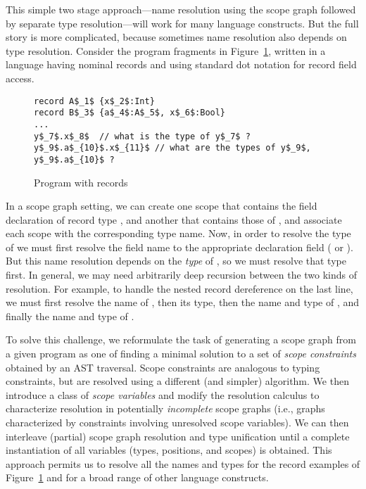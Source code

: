 This simple two stage approach---name resolution using the
scope graph followed by separate type resolution---will work for
many language constructs. But the full story is more complicated,
because sometimes name resolution also depends on type resolution.
Consider the program fragments in Figure~\ref{fig:records-program}, written
in a language having nominal records and using standard dot notation 
for record field access. 
\begin{figure}
\begin{lstlisting}[language=LMR,basicstyle=\lstfigurestyle,breaklines=true]
record A$_1$ {x$_2$:Int}
record B$_3$ {a$_4$:A$_5$, x$_6$:Bool}
...
y$_7$.x$_8$  // what is the type of y$_7$ ? 
y$_9$.a$_{10}$.x$_{11}$ // what are the types of y$_9$, y$_9$.a$_{10}$ ?
\end{lstlisting}
\caption{Program with records}
\label{fig:records-program} 
\end{figure}
In a scope graph setting, we can create one scope that contains
the field declaration of record type , and another that
contains those of , and associate each scope with the
corresponding type name.
Now, in order to resolve the type of  we must first 
resolve the field name  to the appropriate
declaration field ( or ). 
But this name resolution depends on the {\it type} of ,
so we must resolve that type first.  
In general, we may need arbitrarily deep recursion between
the two kinds of resolution. For example, to handle the nested 
record dereference on the last line, we must first resolve the name
of , then its type, then the name and type of , 
and finally the name and type of . 

To solve this challenge, we 
reformulate the task of generating a scope graph from a given program
as one of finding a minimal solution to a set of {\it scope constraints}
obtained by an AST traversal.
Scope constraints are analogous to typing constraints, 
but are resolved using a different (and simpler) algorithm.
We then introduce a class of {\it scope variables} and modify
the resolution calculus to characterize resolution in potentially {\it incomplete} 
scope graphs (i.e., graphs characterized by constraints involving unresolved 
scope variables).
We can then interleave (partial) scope graph resolution and type unification 
until a complete instantiation of all variables (types, positions, and
scopes) is obtained.  This approach permits us to resolve all the names
and types for the record examples of Figure~\ref{fig:records-program} 
and for a broad range of other language constructs. 

